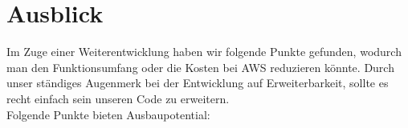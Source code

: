 \documentclass[a4paper, 12pt]{scrreprt}
\renewcommand\_{\textunderscore\allowbreak}
\begin{document}



\chapter{Ausblick}
Im Zuge einer Weiterentwicklung haben wir folgende Punkte gefunden, wodurch man den Funktionsumfang oder die Kosten bei AWS reduzieren könnte. Durch unser ständiges Augenmerk bei der Entwicklung auf Erweiterbarkeit, sollte es recht einfach sein unseren Code zu erweitern. \\
Folgende Punkte bieten Ausbaupotential:
\end{document}
